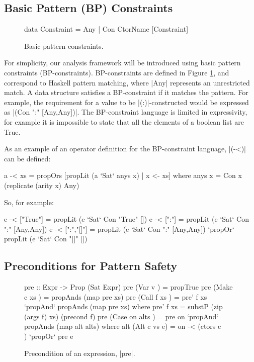 \documentclass[preprint]{sigplanconf}
\begin{document}
\subsection{Basic Pattern (BP) Constraints}
\label{sec:basic}

\begin{figure}
\begin{code}
data Constraint = Any | Con CtorName [Constraint]
\end{code}
\caption{Basic pattern constraints.}
\label{fig:basic}
\end{figure}

For simplicity, our analysis framework will be introduced using basic pattern constraints (BP-constraints). BP-constraints are defined in Figure \ref{fig:basic}, and correspond to Haskell pattern matching, where |Any| represents an unrestricted match. A data structure satisfies a BP-constraint if it matches the pattern. For example, the requirement for a value to be |(:)|-constructed would be expressed as |(Con ":" [Any,Any])|. The BP-constraint language is limited in expressivity, for example it is impossible to state that all the elements of a boolean list are True.

As an example of an operator definition for the BP-constraint language, |(-<)| can be defined:

\begin{code}
a -< xs = propOrs [propLit (a `Sat` anys x) | x <- xs]
    where anys x = Con x (replicate (arity x) Any)
\end{code}

\noindent So, for example:

\begin{code}
e -< ["True"]    =  propLit (e `Sat` Con "True" [])
e -< [":"]       =  propLit (e `Sat` Con ":" [Any,Any])
e -< [":","[]"]  =  propLit (e `Sat` Con ":" [Any,Any]) `propOr`
                    propLit (e `Sat` Con "[]" [])
\end{code}

\subsection{Preconditions for Pattern Safety}
\label{sec:precond}

\begin{figure}
\begin{code}
pre ::  Expr -> Prop (Sat Expr)
pre (Var   v         ) = propTrue
pre (Make  c  xs     ) = propAnds (map pre xs)
pre (Call  f  xs     ) = pre' f xs `propAnd` propAnds (map pre xs)
    where pre' f xs = substP (zip (args f) xs) (precond f)
pre (Case  on  alts  ) = pre on `propAnd` propAnds (map alt alts)
    where alt (Alt c vs e) = on -< (ctors c \\ [c]) `propOr` pre e
\end{code}
\caption{Precondition of an expression, |pre|.}
\label{fig:precondition}
\end{figure}
\end{document}
